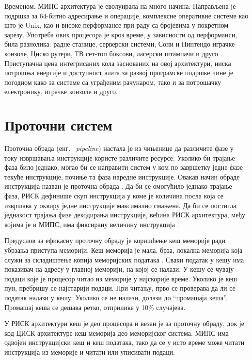 \documentclass[12pt,oneside]{memoir}
\begin{document}
Временом, МИПС архитектура је еволуирала на много начина. Направљена је подршка за 64-битно адресирање и операције, комплексне оперативне системе као што је Unix, као и високе перформансе при раду са бројевима у покретном зарезу. Употреба ових процесора је кроз време, у зависности од перформанси, била разнолика: радне станице, серверски системи, Сони и Нинтендо играчке конзоле, Циско рутери, ТВ сет-топ боксови, ласерски штампачи и друго \cite{mips}.
Приступачна цена интегрисаних кола заснованих на овој архитектури, ниска потрошња енергије и доступност алата за развој програмске подршке чине је погодном како за системе са уграђеним рачунаром, тако и за потрошачку електронику, играчке конзоле и друго.


\section{Проточни систем }
\label{sec:pipeline}
Проточна обрада (енг. ~\textit{pipeline}) настала је из чињенице да различите фазе у току извршавања инструкције користе различите ресурсе. Уколико би трајање фаза било једнако, могао би се направити систем у ком по завршетку једне фазе текуће инструкције, почиње та фаза наредне инструкције. Овакав начин обраде инструкција назван је проточна обрада \cite{pipeline}. Да би се омогућило једнако трајање фаза, РИСК дефинише скуп инструкција у коме је количина посла која се извршава у оквиру једне инструкције максимално смањена. Да би се постигла једнакост трајања фазе декодирања инструкције, већина РИСК архитектура, међу којима је и МИПС, има фиксирану величину инструкција \cite{mips}.

Предуслов за ефикасну проточну обраду је коришћење кеш меморије ради убрзања приступа меморији. Кеш меморија је мала, брза, локална меморија која служи за складиштење копија меморијских података \cite{mips}. Сваки податак у кешу има показивач на адресу у главној меморији, на којој се налази. У кешу се чувају подаци које је процесор читао из меморије у најскорије време. Уколико је кеш пун, пребришу се најстарији подаци. При читању, прво се проверава да ли се податак налази у кешу. Уколико се не налази, долази до “промашаја кеша”. Промашај кеша се дешава ретко, отприлике у 10\% случајева.

У РИСК архитектури кеш је део процесора и везан је за проточну обраду, док је код ЦИСК архитектуре кеш меморија део меморијског система. МИПС има одвојен инструкцијски кеш и кеш података, тако да се у исто време може читати инструкција из меморије и читати или уписивати подаци. 
\end{document}
